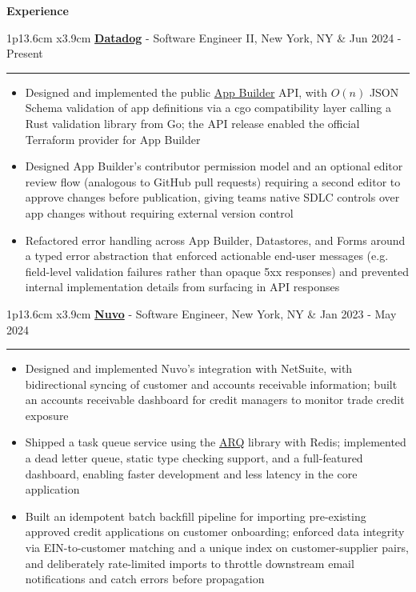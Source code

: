 \documentclass[11pt]{article}
\newcommand{\cvsection}[1]
{
	\begin{center}
		\large\textcolor{sectcol}{\textbf{#1}}
	\end{center}
}
\newcommand{\cvevent}[4]
{

\begin{tabular*}{1\textwidth}{p{13.6cm}  x{3.9cm}}
	\textbf{#2} - \textcolor{bgcol}{#3} &   \vspace{2.5pt}\textcolor{sectcol}{#1}
\end{tabular*}

\vspace{-8pt}
\textcolor{softcol}{\hrule}
\vspace{-3pt}
    #4
}
\begin{document}
%
%

\cvsection{Experience}

\cvevent{Jun 2024 - Present}{\href{https://www.datadoghq.com/}{Datadog}}{Software Engineer II, New York, NY}{
    \begin{itemize}
        \item Designed and implemented the public \href{https://www.datadoghq.com/product/app-builder/}{App Builder} API, with $O(n)$ JSON Schema validation of app definitions via a cgo compatibility layer calling a Rust validation library from Go; the API release enabled the official Terraform provider for App Builder
        \item Designed App Builder's contributor permission model and an optional editor review flow (analogous to GitHub pull requests) requiring a second editor to approve changes before publication, giving teams native SDLC controls over app changes without requiring external version control
        \item Refactored error handling across App Builder, Datastores, and Forms around a typed error abstraction that enforced actionable end-user messages (e.g. field-level validation failures rather than opaque 5xx responses) and prevented internal implementation details from surfacing in API responses
    \end{itemize}
}

\cvevent{Jan 2023 - May 2024}{\href{https://nuvo.com/}{Nuvo}}{Software Engineer, New York, NY}{
    \begin{itemize}
        \item Designed and implemented Nuvo's integration with NetSuite, with bidirectional syncing of customer and accounts receivable information; built an accounts receivable dashboard for credit managers to monitor trade credit exposure
        \item Shipped a task queue service using the \href{https://arq-docs.helpmanual.io/}{ARQ} library with Redis; implemented a dead letter queue, static type checking support, and a full-featured dashboard, enabling faster development and less latency in the core application
        \item Built an idempotent batch backfill pipeline for importing pre-existing approved credit applications on customer onboarding; enforced data integrity via EIN-to-customer matching and a unique index on customer-supplier pairs, and deliberately rate-limited imports to throttle downstream email notifications and catch errors before propagation
    \end{itemize}
}
\end{document}
